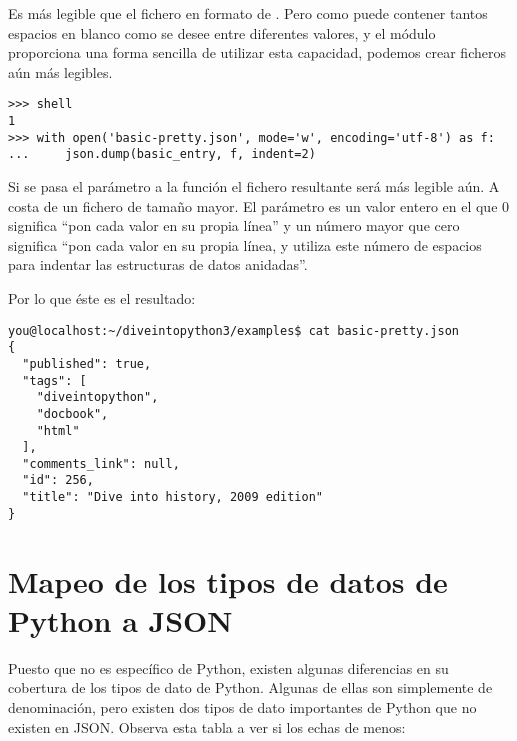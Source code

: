 Es más legible que el fichero en formato de . Pero como  puede contener tantos espacios en blanco como se desee entre diferentes valores, y el módulo  proporciona una forma sencilla de utilizar esta capacidad, podemos crear ficheros  aún más legibles.

\noindent\begin{minipage}{\textwidth}
\begin{lstlisting}[mathescape=False]
>>> shell
1
>>> with open('basic-pretty.json', mode='w', encoding='utf-8') as f:
...     json.dump(basic_entry, f, indent=2) 
\end{lstlisting}
\end{minipage}

Si se pasa el parámetro  a la función  el fichero  resultante será más legible aún. A costa de un fichero de tamaño mayor. El parámetro  es un valor entero en el que 0 significa ``pon cada valor en su propia línea'' y un número mayor que cero significa ``pon cada valor en su propia línea, y utiliza este número de espacios para indentar las estructuras de datos anidadas''.

Por lo que éste es el resultado:

\noindent\begin{minipage}{\textwidth}
\begin{lstlisting}[mathescape=False]
you@localhost:~/diveintopython3/examples$ cat basic-pretty.json
{
  "published": true, 
  "tags": [
    "diveintopython", 
    "docbook", 
    "html"
  ], 
  "comments_link": null, 
  "id": 256, 
  "title": "Dive into history, 2009 edition"
}
\end{lstlisting}
\end{minipage}

\section{Mapeo de los tipos de datos de Python a JSON}

Puesto que  no es específico de Python, existen algunas diferencias en su cobertura de los tipos de dato de Python. Algunas de ellas son simplemente de denominación, pero existen dos tipos de dato importantes de Python que no existen en JSON. Observa esta tabla a ver si los echas de menos:

